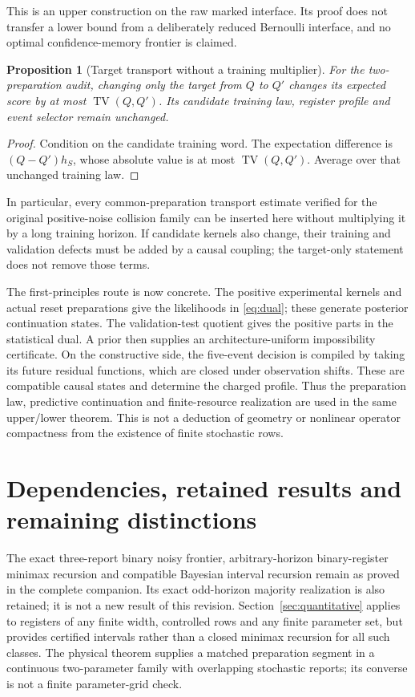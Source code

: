 \documentclass[11pt]{amsart}
\newtheorem{proposition}[theorem]{Proposition}
\theoremstyle{definition}\newtheorem{definition}[theorem]{Definition}
\theoremstyle{remark}\newtheorem{remark}[theorem]{Remark}
\newcommand{\TV}{\operatorname{TV}}
\newcommand{\1}{\mathbf 1}
\begin{document}
This is an upper construction on the raw marked interface. Its proof
does not transfer a lower bound from a deliberately reduced Bernoulli
interface, and no optimal confidence-memory frontier is claimed.

\begin{proposition}[Target transport without a training multiplier]
\label{prop:transport}
For the two-preparation audit, changing only the target from $Q$ to $Q'$
changes its expected score by at most $\TV(Q,Q')$. Its candidate training
law, register profile and event selector remain unchanged.
\end{proposition}
\begin{proof}
Condition on the candidate training word. The expectation difference is
$(Q-Q')h_S$, whose absolute value is at most $\TV(Q,Q')$. Average over
that unchanged training law.
\end{proof}
In particular, every common-preparation transport estimate verified for
the original positive-noise collision family can be inserted here
without multiplying it by a long training horizon. If candidate kernels
also change, their training and validation defects must be added by a
causal coupling; the target-only statement does not remove those terms.

The first-principles route is now concrete. The positive experimental
kernels and actual reset preparations give the likelihoods in
\eqref{eq:dual}; these generate posterior continuation states. The
validation-test quotient gives the positive parts in the statistical
dual. A prior then supplies an architecture-uniform impossibility
certificate. On the constructive side, the five-event decision is
compiled by taking its future residual functions, which are closed under
observation shifts. These are compatible causal states and determine the
charged profile. Thus the preparation law, predictive continuation and
finite-resource realization are used in the same upper/lower theorem.
This is not a deduction of geometry or nonlinear operator compactness
from the existence of finite stochastic rows.

\section{Dependencies, retained results and remaining distinctions}
The exact three-report binary noisy frontier, arbitrary-horizon
binary-register minimax recursion and compatible Bayesian interval
recursion remain as proved in the complete companion. Its exact
odd-horizon majority realization is also retained; it is not a new result
of this revision. Section~\ref{sec:quantitative} applies to registers
of any finite width, controlled rows and any finite parameter set, but
provides certified intervals rather than a closed minimax recursion for
all such classes. The physical theorem supplies a matched preparation
segment in a continuous two-parameter family with overlapping stochastic
reports; its converse is not a finite parameter-grid check.
\end{document}
